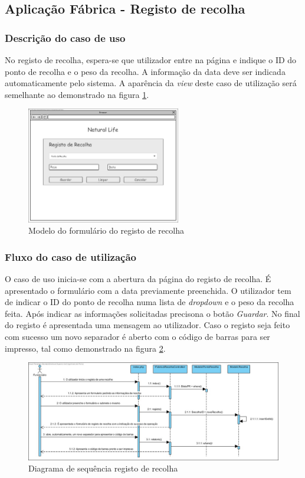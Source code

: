 \subsection{Aplicação Fábrica - Registo de recolha}
\subsubsection*{Descrição do caso de uso}
No registo de recolha, espera-se que utilizador entre na página e indique o ID do ponto de recolha e o peso da recolha. A informação da data deve ser indicada automaticamente pelo sistema. A aparência da \textit{view} deste caso de utilização será semelhante ao demonstrado na figura \ref{fig:di_recolha}. 

\begin{figure}[H] 
	\begin{center}
		\includegraphics[width=0.60\textwidth,keepaspectratio]{figuras/Diagramas_vp/DI_Fabrica_2_Registo_de_Recolha.jpg}
		\caption{Modelo do formulário do registo de recolha}
		\label{fig:di_recolha} 
	\end{center}
\end{figure}

\subsubsection*{Fluxo do caso de utilização}
O caso de uso inicia-se com a abertura da página do registo de recolha. É apresentado o formulário com a data previamente preenchida. O utilizador tem de indicar o ID do ponto de recolha numa lista de \textit{dropdown} e o peso da recolha feita. Após indicar as informações solicitadas precisona o botão \textit{Guardar}. No final do registo é apresentada uma mensagem ao utilizador. Caso o registo seja feito com sucesso um novo separador é aberto com o código de barras para ser impresso, tal como demonstrado na figura \ref{fig:sd_recolha}.


\begin{figure}[H] 
	\begin{center}
		\includegraphics[width=\textwidth,keepaspectratio]{figuras/Diagramas_vp/SD_Fabrica_2_Registo_de_Recolhas.jpg}
		\caption{Diagrama de sequência registo de recolha}
		\label{fig:sd_recolha} 
	\end{center}
\end{figure}
